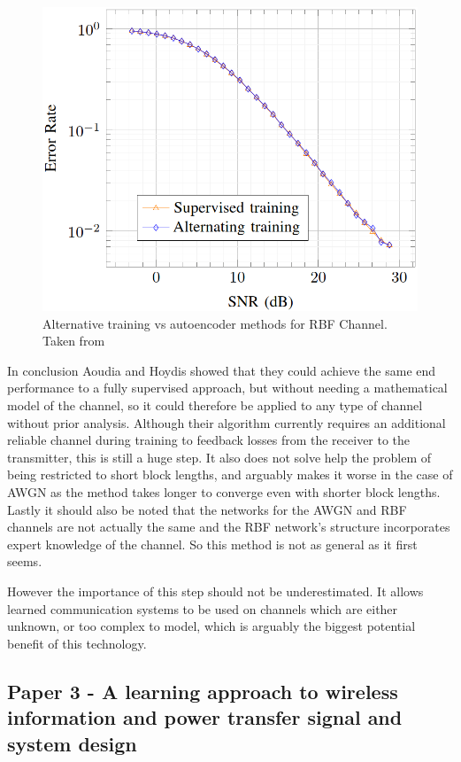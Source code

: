 \documentclass[12pt,onecolumn,letterpaper]{article}
\begin{document}
\begin{figure}[t]
\begin{center}
   \includegraphics[width=0.8\linewidth]{figures/Aoudia_RBF_performance.PNG}
\end{center}
   \caption{Alternative training vs autoencoder methods for RBF Channel. Taken from~\cite{Aoudia}}
\label{fig:AoudiaPerformanceRbf}
\end{figure}

In conclusion Aoudia and Hoydis showed that they could achieve the same end performance to a fully supervised approach, but without needing a mathematical model of the channel, so it could therefore be applied to any type of channel without prior analysis. 
Although their algorithm currently requires an additional reliable channel during training to feedback losses from the receiver to the transmitter, this is still a huge step. It also does not solve help the problem of being restricted to short block lengths, and arguably makes it worse in the case of AWGN as the method takes longer to converge even with shorter block lengths. Lastly it should also be noted that the networks for the AWGN and RBF channels are not actually the same and the RBF network's structure incorporates expert knowledge of the channel. So this method is not as general as it first seems.

However the importance of this step should not be underestimated. It allows learned communication systems to be used on channels which are either unknown, or too complex to model, which is arguably the biggest potential benefit of this technology. 

\FloatBarrier
\subsection{Paper 3 - A learning approach to wireless information and power transfer signal and system design}
\end{document}
